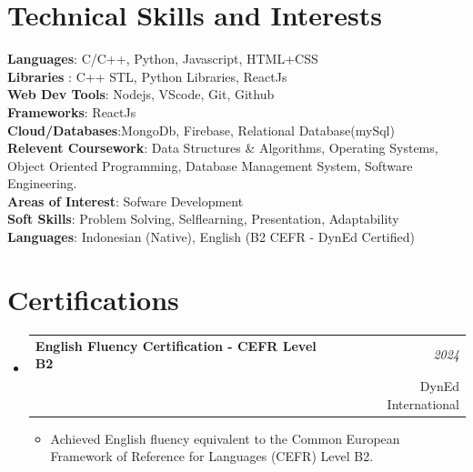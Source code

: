 \documentclass[a4paper,11pt]{article}
\makeatletter
\newcommand{\resumeSubheading}[4]{
\vspace{0.5mm}\item
    \begin{tabular*}{0.98\textwidth}[t]{l@{\extracolsep{\fill}}r}
        \textbf{#1} & \textit{\footnotesize{#4}} \\
        \textit{\footnotesize{#3}} &  \footnotesize{#2}\\
    \end{tabular*}
    \vspace{-2.4mm}
}
\newcommand{\resumeSubHeadingListStart}{\begin{itemize}[leftmargin=*,labelsep=0mm]}
\newcommand{\resumeItemListStart}{\begin{justify}\begin{itemize}[leftmargin=3ex, rightmargin=2ex, noitemsep,labelsep=1.2mm,itemsep=0mm]\small}
\newcommand{\resumeSubHeadingListEnd}{\end{itemize}\vspace{2mm}}
\newcommand{\resumeItemListEnd}{\end{itemize}\end{justify}\vspace{-2mm}}
\makeatother
\begin{document}
\section{\textbf{Technical Skills and Interests}}
\begin{itemize}[leftmargin=0.05in, label={}]
  \small{\item{
        \textbf{Languages}{: C/C++, Python, Javascript, HTML+CSS } \\
        \textbf{Libraries }{: C++ STL, Python Libraries, ReactJs }\\
        \textbf{Web Dev Tools}{: Nodejs, VScode, Git, Github } \\
        \textbf{Frameworks}{: ReactJs } \\
        \textbf{Cloud/Databases}{:MongoDb, Firebase, Relational Database(mySql) } \\

        \textbf{Relevent Coursework}{: Data Structures \& Algorithms, Operating Systems, Object Oriented Programming, Database Management System, Software Engineering. } \\
        \textbf{Areas of Interest}{: Sofware Development} \\
        \textbf{Soft Skills}{: Problem Solving, Self\-learning, Presentation, Adaptability} \\
        \textbf{Languages}{: Indonesian (Native), English (B2 CEFR - DynEd Certified)} \\
        }}
\end{itemize}

\section{\textbf{Certifications}}
\resumeSubHeadingListStart
\resumeSubheading
{English Fluency Certification - CEFR Level B2}{DynEd International}
{}{2024}
\resumeItemListStart
\item {Achieved English fluency equivalent to the Common European Framework of Reference for Languages (CEFR) Level B2.}
\resumeItemListEnd
\resumeSubHeadingListEnd
\vspace{-16pt}
\end{document}
